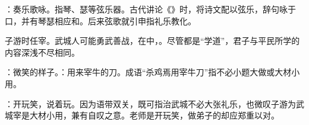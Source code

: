 {
\item {}：奏乐歌咏。指琴、瑟等弦乐器。古代讲论《》时，将诗文配以弦乐，辞句咏于口，并有琴瑟相应和。后来弦歌就引申指礼乐教化。

子游时任宰。武城人可能勇武善战，在中，。尽管都是“学道”，君子与平民所学的内容深浅不尽相同。

\item {}：微笑的样子。：用来宰牛的刀。成语“杀鸡焉用宰牛刀”指不必小题大做或大材小用。

\item {}：开玩笑，说着玩。因为语带双关，既可指治武城不必大张礼乐，也微叹子游为武城宰是大材小用，兼有自叹之意。老师是开玩笑，做弟子的却应郑重以对。
}
{}


